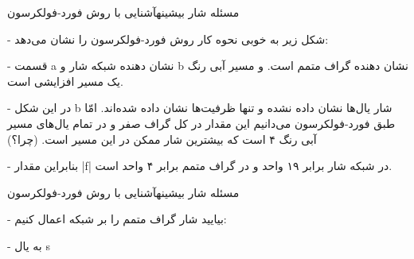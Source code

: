 \begin{itemframe}{مسئله شار بیشینه}{آشنایی با روش فورد-فولکرسون}
\item[-]
شکل زیر به خوبی نحوه کار روش فورد-فولکرسون را نشان می‌دهد:
\item[-]
قسمت a نشان دهنده شبکه شار و b نشان دهنده گراف متمم است. و مسیر آبی رنگ یک مسیر افزایشی است.
\item[-]
در این شکل b شار یال‌ها نشان داده نشده و تنها ظرفیت‌ها نشان داده شده‌اند. امّا طبق فورد-فولکرسون می‌دانیم این مقدار در کل گراف صفر و در تمام یال‌های مسیر آبی رنگ ۴ است که بیشترین شار ممکن در این مسیر است. (چرا؟)
\item[-]
بنابراین مقدار |f| در شبکه شار برابر ۱۹ واحد و در گراف متمم برابر ۴ واحد است.
\end{itemframe}

\begin{itemframe}{مسئله شار بیشینه}{آشنایی با روش فورد-فولکرسون}
\item[-]
بیایید شار گراف متمم را بر شبکه اعمال کنیم:
\item[-]
به یال s

\end{itemframe}
